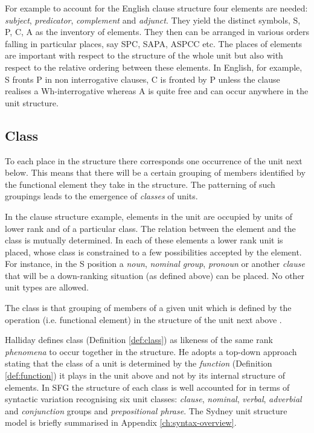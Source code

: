 For example to account for the English clause structure four elements are needed: \textit{subject}, \textit{predicator}, \textit{complement} and \textit{adjunct}. They yield the distinct symbols, S, P, C, A as the inventory of elements. They then can be arranged in various orders falling in particular places, say SPC, SAPA, ASPCC etc. The places of elements are important with respect to the structure of the whole unit but also with respect to the relative ordering between these elements. In English, for example, S fronts P in non interrogative clauses, C is fronted by P unless the clause realises a Wh-interrogative whereas A is quite free and can occur anywhere in the unit structure.

\subsection{Class}

To each place in the structure there corresponds one occurrence of the unit next below. This means that there will be a certain grouping of members identified by the functional element they take in the structure. The patterning of such groupings leads to the emergence of \textit{classes} of units.

In the clause structure example, elements in the unit are occupied by units of lower rank and of a particular class. The relation between the element and the class is mutually determined. In each of these elements a lower rank unit is placed, whose class is constrained to a few possibilities accepted by the element. For instance, in the S position a \textit{noun}, \textit{nominal group}, \textit{pronoun} or another \textit{clause} that will be a down-ranking situation (as defined above) can be placed. No other unit types are allowed.

\begin{definition}[Class]\label{def:class}
	The class is that grouping of members of a given unit which is defined by the operation (i.e. functional element) in the structure of the unit next above \citep[49]{Halliday2002}.
\end{definition}

Halliday defines class (Definition \ref{def:class}) as likeness of the same rank \textit{phenomena} to occur together in the structure. He adopts a top-down approach stating that the class of a unit is determined by the \textit{function} (Definition \ref{def:function}) it plays in the unit above and not by its internal structure of elements. In SFG the structure of each class is well accounted for in terms of syntactic variation recognising six unit classes: \textit{clause}, \textit{nominal}, \textit{verbal}, \textit{adverbial} and \textit{conjunction} groups and \textit{prepositional phrase}. The Sydney unit structure model is briefly summarised in Appendix \ref{ch:syntax-overview}.

